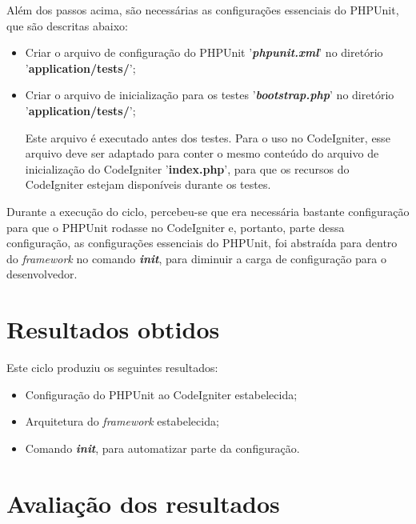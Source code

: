 	  Além dos passos acima, são necessárias as configurações essenciais do PHPUnit, que são descritas abaixo:
	  
	  \begin{itemize}
	    \item Criar o arquivo de configuração do PHPUnit '\textbf{\textit{phpunit.xml}}' 
		  no diretório '\textbf{application/tests/}';
	    
	    \item Criar o arquivo de inicialização para os testes '\textbf{\textit{bootstrap.php}}'
		  no diretório '\textbf{application/tests/}';
	      
		\subitem Este arquivo é executado antes dos testes. Para o uso no CodeIgniter, esse arquivo deve ser
			 adaptado para conter o mesmo conteúdo do arquivo de inicialização do CodeIgniter '\textbf{index.php}', 
			 para que os recursos do CodeIgniter estejam disponíveis durante os testes.
	  \end{itemize}
	  
	  Durante a execução do ciclo, percebeu-se que era necessária bastante configuração para que o PHPUnit rodasse no
	  CodeIgniter e, portanto, parte dessa configuração, as configurações essenciais do PHPUnit, foi abstraída para
	  dentro do \textit{framework} no comando \textit{\textbf{init}}, para diminuir a carga de configuração
	  para o desenvolvedor.
  
  \section{Resultados obtidos}
    
      Este ciclo produziu os seguintes resultados:
      
      \begin{itemize}

	\item Configuração do PHPUnit ao CodeIgniter estabelecida;
	
	\item Arquitetura do \textit{framework} estabelecida;
	
	\item Comando \textit{\textbf{init}}, para automatizar parte da configuração.

      \end{itemize}

  \section{Avaliação dos resultados}
  
